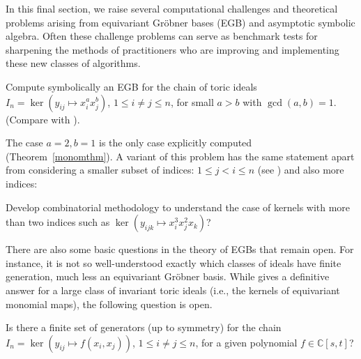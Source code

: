 
In this final section, we raise several computational challenges and theoretical problems arising from equivariant Gr\"obner bases (EGB) and asymptotic symbolic algebra.  Often these challenge problems can serve as benchmark tests for sharpening the methods of practitioners who are improving and implementing these new classes of algorithms.

\begin{problem}
Compute symbolically an EGB for the chain of toric ideals $I_n = \ker(y_{ij} \mapsto x_i^a x_j^b)$, $1 \leq i \neq j \leq n$, for small $a>b$ with $\gcd(a,b)=1$. (Compare with \cite{Hillar13, hillar2016corrigendum, KKL:equivariant-markov, draisma2013noetherianity, Krone:egb-toric}).
\end{problem}

The case $a=2,b=1$ is the only case explicitly computed (Theorem~\ref{monomthm}). A variant of this problem has the same statement apart from considering a smaller subset of indices: $1 \leq j < i \leq n$ (see \cite[Remark 6.3]{draisma2013noetherianity}) and also more indices:

\begin{problem}
Develop combinatorial methodology to understand the case of kernels with more than two indices such as $\ker(y_{ijk} \mapsto x_i^3 x_j^2 x_k)$?  
\end{problem}

There are also some basic questions in the theory of EGBs that remain open.  For instance, it is not so well-understood exactly which classes of ideals have finite generation, much less an equivariant Gr\"obner basis. 
While \cite{draisma2013noetherianity} gives a definitive answer for a large class of invariant toric ideals (i.e., the kernels of equivariant monomial maps), the following question is open.
\begin{question}
Is there a finite set of generators (up to symmetry) for the chain $I_n = \ker(y_{ij} \mapsto f(x_i,x_j))$, $1 \leq i \neq j \leq n$, for a given polynomial $f \in \mathbb C[s,t]$?  
\end{question}

